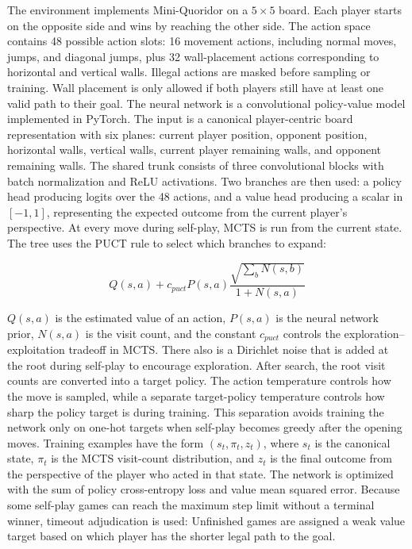 \documentclass{article}
\begin{document}
The environment implements Mini-Quoridor on a \(5 \times 5\) board. Each player starts on the opposite side and wins by reaching the other side. The action space contains 48 possible action slots: 16 movement actions, including normal moves, jumps, and diagonal jumps, plus 32 wall-placement actions corresponding to horizontal and vertical walls. Illegal actions are masked before sampling or training. Wall placement is only allowed if both players still have at least one valid path to their goal.
The neural network is a convolutional policy-value model implemented in PyTorch. The input is a canonical player-centric board representation with six planes: current player position, opponent position, horizontal walls, vertical walls, current player remaining walls, and opponent remaining walls. The shared trunk consists of three convolutional blocks with batch normalization and ReLU activations. Two branches are then used: a policy head producing logits over the 48 actions, and a value head producing a scalar in \([-1, 1]\), representing the expected outcome from the current player’s perspective.
At every move during self-play, MCTS is run from the current state. The tree uses the PUCT rule \cite{silver2017alphazero} to select which branches to expand:

\[
Q(s,a) + c_{puct} P(s,a) \frac{\sqrt{\sum_b N(s,b)}}{1 + N(s,a)}
\]

\(Q(s,a)\) is the estimated value of an action, \(P(s,a)\) is the neural network prior, \(N(s,a)\) is the visit count, and the constant $c_{puct}$ controls the exploration--exploitation tradeoff in MCTS. There also is a Dirichlet noise that is added at the root during self-play to encourage exploration. After search, the root visit counts are converted into a target policy. The action temperature controls how the move is sampled, while a separate target-policy temperature controls how sharp the policy target is during training. This separation avoids training the network only on one-hot targets when self-play becomes greedy after the opening moves.
Training examples have the form \((s_t, \pi_t, z_t)\), where \(s_t\) is the canonical state, \(\pi_t\) is the MCTS visit-count distribution, and \(z_t\) is the final outcome from the perspective of the player who acted in that state. The network is optimized with the sum of policy cross-entropy loss and value mean squared error. Because some self-play games can reach the maximum step limit without a terminal winner, timeout adjudication is used: Unfinished games are assigned a weak value target based on which player has the shorter legal path to the goal.
\end{document}
